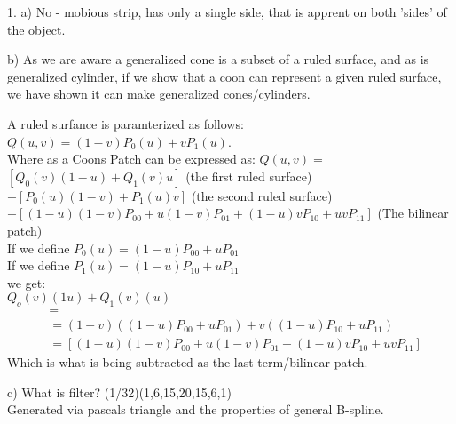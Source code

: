 1.
a) No - mobious strip, has only a single side, that is apprent on both 'sides' of the object.

b)
As we are aware a generalized cone is a subset of a ruled surface, and as is generalized cylinder, if we show that a coon can represent a given ruled surface, we have shown it can make generalized cones/cylinders.

A ruled surfance is paramterized as follows: $Q(u,v) = (1 - v)P_0(u) + vP_1(u)$. \\
Where as a Coons Patch can be expressed as: $Q(u, v) =$ \\
$[Q_0 (v)(1 - u) + Q_1 (v)u]$ (the first ruled surface) \\
$+ [P_0 (u)(1 - v) + P_1 (u)v]$ (the second ruled surface) \\
$- [(1 - u)(1 - v)P_{00} + u(1 - v)P_{01} + (1 - u)vP_{10} + uvP_{11} ]$ (The bilinear patch) \\

If we define $P_0(u) = (1-u)P_{00} + uP_{01}$ \\
If we define $P_1(u) = (1-u)P_{10} + uP_{11}$ \\
we get: \\
$Q_o(v)(1u) + Q_1(v)(u)$ \\
\begin{align*}
[P_0 (u)(1 - v) + P_1 (u)v] &= \\
&= (1-v)((1-u)P_{00} + uP_{01}) + v((1-u)P_{10} + uP_{11}) \\
&= [(1 - u)(1 - v)P_{00} + u(1 - v)P_{01} + (1 - u)vP_{10} + uvP_{11} ]
\end{align*}
Which is what is being subtracted as the last term/bilinear patch.

c) What is filter?
(1/32)(1,6,15,20,15,6,1) \\
Generated via pascals triangle and the properties of general B-spline. \\


